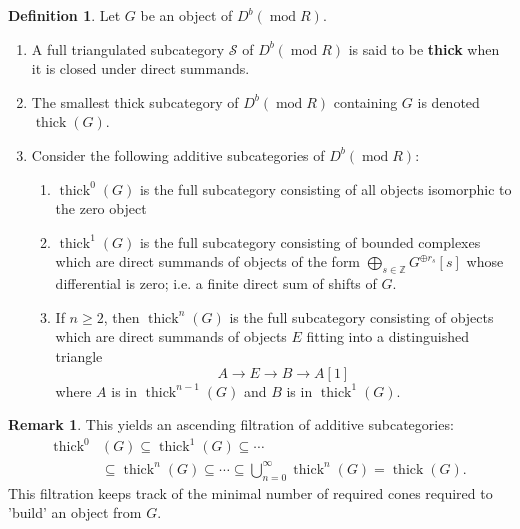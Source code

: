 \documentclass[11pt]{amsart}
\theoremstyle{plain}
\theoremstyle{definition}
\newtheorem{definition}[theorem]{Definition}
\newtheorem{remark}[theorem]{Remark}
\numberwithin{equation}{section}
\numberwithin{theorem}{section}
\begin{document}
\begin{definition}
    Let $G$ be an object of $D^b (\operatorname{mod}R)$.
    \begin{enumerate}
        \item A full triangulated subcategory $\mathcal{S}$ of $D^b(\operatorname{mod} R)$ is said to be \textbf{thick} when it is closed under direct summands.
        \item The smallest thick subcategory of $D^b(\operatorname{mod}R)$ containing $G$ is denoted $\operatorname{thick} (G)$.
        \item Consider the following additive subcategories of $D^b (\operatorname{mod}R)$:
        \begin{enumerate}
            \item $\operatorname{thick}^0 (G)$ is the full subcategory consisting of all objects isomorphic to the zero object 
            \item $\operatorname{thick}^1 (G)$ is the full subcategory consisting of bounded complexes which are direct summands of objects of the form $\bigoplus_{s\in \mathbb{Z}} G^{\oplus r_s}[s]$ whose differential is zero; i.e. a finite direct sum of shifts of $G$. 
            \item If $n\geq 2$, then $\operatorname{thick}^n (G)$ is the full subcategory consisting of objects which are direct summands of objects $E$ fitting into a distinguished triangle
            \begin{displaymath}
            A \to E \to B \to A[1]
            \end{displaymath}
            where $A$ is in $\operatorname{thick}^{n-1} (G)$ and $B$ is in $\operatorname{thick}^1 (G)$.
        \end{enumerate}
    \end{enumerate}
\end{definition}

\begin{remark}
    This yields an ascending filtration of additive subcategories:
    \begin{displaymath}
        \begin{aligned}
            \operatorname{thick}^0  & (G) \subseteq \operatorname{thick}^1 (G) \subseteq \cdots \\& \subseteq \operatorname{thick}^n (G) \subseteq \cdots \subseteq \bigcup^\infty_{n=0} \operatorname{thick}^n (G)= \operatorname{thick} (G).
        \end{aligned}
    \end{displaymath}
     This filtration keeps track of the minimal number of required cones required to 'build' an object from $G$. 
\end{remark}
    
\end{document}
